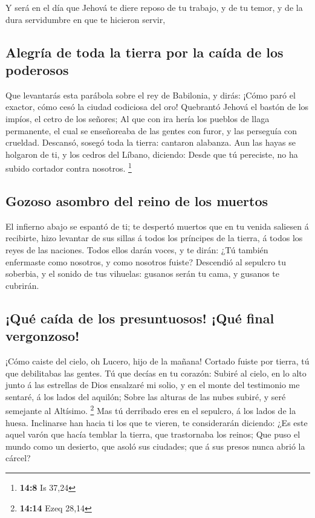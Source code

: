  Y será en el día que Jehová te diere reposo de tu
trabajo, y de tu temor, y de la dura servidumbre en que te hicieron
servir,

\hypertarget{alegruxeda-de-toda-la-tierra-por-la-cauxedda-de-los-poderosos}{%
\subsection{Alegría de toda la tierra por la caída de los
poderosos}\label{alegruxeda-de-toda-la-tierra-por-la-cauxedda-de-los-poderosos}}

 Que levantarás esta parábola sobre el rey de Babilonia, y
dirás: ¡Cómo paró el exactor, cómo cesó la ciudad codiciosa del oro!
 Quebrantó Jehová el bastón de los impíos, el cetro de los
señores;  Al que con ira hería los pueblos de llaga
permanente, el cual se enseñoreaba de las gentes con furor, y las
perseguía con crueldad.  Descansó, sosegó toda la tierra:
cantaron alabanza.  Aun las hayas se holgaron de ti, y los
cedros del Líbano, diciendo: Desde que tú pereciste, no ha subido
cortador contra nosotros. \footnote{\textbf{14:8} Is 37,24}

\hypertarget{gozoso-asombro-del-reino-de-los-muertos}{%
\subsection{Gozoso asombro del reino de los
muertos}\label{gozoso-asombro-del-reino-de-los-muertos}}

 El infierno abajo se espantó de ti; te despertó muertos
que en tu venida saliesen á recibirte, hizo levantar de sus sillas á
todos los príncipes de la tierra, á todos los reyes de las naciones.
 Todos ellos darán voces, y te dirán: ¿Tú también
enfermaste como nosotros, y como nosotros fuiste? 
Descendió al sepulcro tu soberbia, y el sonido de tus vihuelas: gusanos
serán tu cama, y gusanos te cubrirán.

\hypertarget{quuxe9-cauxedda-de-los-presuntuosos-quuxe9-final-vergonzoso}{%
\subsection{¡Qué caída de los presuntuosos! ¡Qué final
vergonzoso!}\label{quuxe9-cauxedda-de-los-presuntuosos-quuxe9-final-vergonzoso}}

 ¡Cómo caiste del cielo, oh Lucero, hijo de la mañana!
Cortado fuiste por tierra, tú que debilitabas las gentes.
 Tú que decías en tu corazón: Subiré al cielo, en lo alto
junto á las estrellas de Dios ensalzaré mi solio, y en el monte del
testimonio me sentaré, á los lados del aquilón;  Sobre
las alturas de las nubes subiré, y seré semejante al Altísimo.
\footnote{\textbf{14:14} Ezeq 28,14}  Mas tú derribado
eres en el sepulcro, á los lados de la huesa.  Inclinarse
han hacia ti los que te vieren, te considerarán diciendo: ¿Es este aquel
varón que hacía temblar la tierra, que trastornaba los reinos;
 Que puso el mundo como un desierto, que asoló sus
ciudades; que á sus presos nunca abrió la cárcel?

